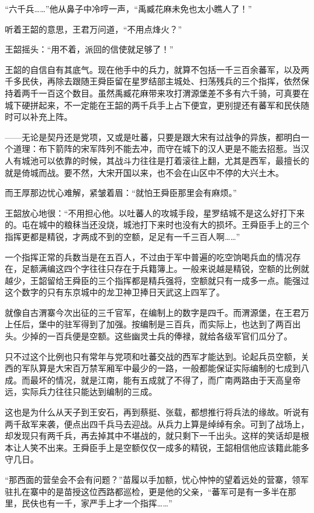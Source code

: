 “六千兵……”他从鼻子中冷哼一声，“禹臧花麻未免也太小瞧人了！”

听着王韶的意思，王君万问道，“不用点烽火？”

王韶摇头：“用不着，派回的信使就足够了！”

王韶的自信自有其底气。现在他手中的兵力，就算不包括一千三百余蕃军，以及两千多民伕，再除去跟随王舜臣留在星罗结部主城处、扫荡残兵的三个指挥，依然保持着两千一百这个数目。虽然禹臧花麻带来攻打渭源堡差不多有六千骑，可真要在城下硬拼起来，不一定能在王韶的两千兵手上占下便宜，更别提还有蕃军和民伕随时可以补充上阵。

——无论是契丹还是党项，又或是吐蕃，只要是跟大宋有过战争的异族，都明白一个道理：布下箭阵的宋军阵列不能去冲，而守在城下的汉人更是不能去招惹。当汉人有城池可以依靠的时候，其战斗力往往是打着滚往上翻，尤其是西军，最擅长的就是倚城而战。要不然，大宋开国以来，也不会在山区中不停的大兴土木。

而王厚那边忧心难解，紧皱着眉：“就怕王舜臣那里会有麻烦。”

王韶放心地很：“不用担心他。以吐蕃人的攻城手段，星罗结城不是这么好打下来的。屯在城中的粮秣当还没烧，城池打下来时也没有大的损坏。王舜臣手上的三个指挥更都是精锐，才两成不到的空额，足足有一千三百人啊……”

一个指挥正常的兵数当是在五百人，不过由于军中普遍的吃空饷喝兵血的情况存在，足额满编这四个字往往只存在于兵籍簿上。一般来说越是精锐，空额的比例就越少，王韶留给王舜臣的三个指挥都是精兵强将，空额就只有一成多一点。能强过这个数字的只有东京城中的龙卫神卫捧日天武这上四军了。

就像自古渭寨今次出征的三千官军，在编制上的数字是四千。而渭源堡，在王君万上任后，堡中的驻军得到了加强。按编制是三百兵，而实际上，也达到了两百出头。少掉的一百兵便是空额。这些幽灵士兵的俸禄，就给各级军官们瓜分了。

只不过这个比例也只有常年与党项和吐蕃交战的西军才能达到。论起兵员空额，关西的军队算是大宋百万禁军厢军中最少的一路，一般都能保证实际编制的七成到八成。而最坏的情况，就是江南，能有五成就了不得了，而广南两路由于天高皇帝远，实际兵力往往只能达到编制的三成。

这也是为什么从天子到王安石，再到蔡挺、张载，都想推行将兵法的缘故。听说有两千敌军来袭，便点出四千兵马去迎战。从兵力上算是绰绰有余。可到了战场上，却发现只有两千兵，再去掉其中不堪战的，就只剩下一千出头。这样的笑话却是根本让人笑不出来。王舜臣手上是空额仅仅一成多的精锐，王韶相信他应该籍此能多守几日。

“那西面的营垒会不会有问题？”苗履以手加额，忧心忡忡的望着远处的营寨，领军驻扎在寨中的是苗授这位西路都巡检，更是他的父亲，“蕃军可是有一多半在那里，民伕也有一千，家严手上才一个指挥……”

